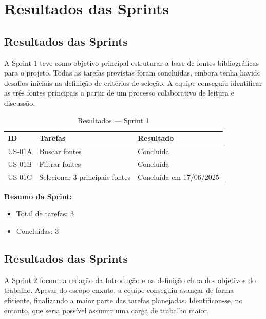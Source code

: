 \section{Resultados das Sprints}

\subsection{Resultados das Sprints}

A Sprint 1 teve como objetivo principal estruturar a base de fontes bibliográficas para o projeto. Todas as tarefas previstas foram concluídas, embora tenha havido desafios iniciais na definição de critérios de seleção. A equipe conseguiu identificar as três fontes principais a partir de um processo colaborativo de leitura e discussão.

\begin{table}[htbp]
  \centering
  \caption{Resultados — Sprint 1}
  \label{tab:resultSprint1}
  \begin{tabular}{lll}
    \toprule
    ID & Tarefas & Resultado \\
    \midrule
    US-01A & Buscar fontes & Concluída \\
    US-01B & Filtrar fontes & Concluída \\
    US-01C & Selecionar 3 principais fontes & Concluída em 17/06/2025 \\
    \bottomrule
  \end{tabular}
\end{table}

\vspace{1em}
\noindent\textbf{Resumo da Sprint:}
\begin{itemize}[noitemsep]
  \item Total de tarefas: 3
  \item Concluídas: 3
\end{itemize}


\subsection{Resultados das Sprints}

A Sprint 2 focou na redação da Introdução e na definição clara dos objetivos do trabalho. Apesar do escopo enxuto, a equipe conseguiu avançar de forma eficiente, finalizando a maior parte das tarefas planejadas. Identificou-se, no entanto, que seria possível assumir uma carga de trabalho maior.

